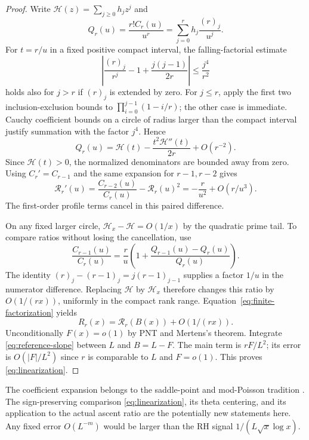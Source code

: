 \documentclass[11pt]{article}
\theoremstyle{definition}
\begin{document}
\begin{proof}
Write $\mathcal H(z)=\sum_{j\ge0}h_jz^j$ and
\[
 Q_r(u)=\frac{r!C_r(u)}{u^r}
       =\sum_{j=0}^r h_j\frac{(r)_j}{u^j}.
\]
For $t=r/u$ in a fixed positive compact interval, the falling-factorial
estimate
\[
 \left|\frac{(r)_j}{r^j}-1+\frac{j(j-1)}{2r}\right|
 \le \frac{j^4}{r^2}
\]
holds also for $j>r$ if $(r)_j$ is extended by zero. For $j\le r$,
apply the first two inclusion-exclusion bounds to
$\prod_{i=0}^{j-1}(1-i/r)$; the other case is immediate.
Cauchy coefficient bounds on a circle of radius larger than the
compact interval justify summation with the factor $j^4$. Hence
\begin{equation}\label{eq:profile-expansion}
 Q_r(u)=\mathcal H(t)-\frac{t^2\mathcal H''(t)}{2r}
                  +O(r^{-2}).
\end{equation}
Since $\mathcal H(t)>0$, the normalized denominators are bounded
away from zero. Using $C_r'=C_{r-1}$ and the same expansion for
$r-1,r-2$ gives
\begin{equation}\label{eq:reference-slope}
 \mathcal R_r'(u)
 =\frac{C_{r-2}(u)}{C_r(u)}-\mathcal R_r(u)^2
 =-\frac r{u^2}+O(r/u^3).
\end{equation}
The first-order profile terms cancel in this paired difference.

On any fixed larger circle,
$\mathcal H_x-\mathcal H=O(1/x)$ by the quadratic prime tail.
To compare ratios without losing the cancellation, use
\[
 \frac{C_{r-1}(u)}{C_r(u)}
 =\frac r u\left(1+\frac{Q_{r-1}(u)-Q_r(u)}{Q_r(u)}\right).
\]
The identity $(r)_j-(r-1)_j=j(r-1)_{j-1}$ supplies a factor $1/u$
in the numerator difference. Replacing $\mathcal H$ by $\mathcal H_x$
therefore changes this ratio by $O(1/(rx))$, uniformly in the compact
rank range. Equation~\eqref{eq:finite-factorization} yields
\[
 R_r(x)=\mathcal R_r(B(x))+O(1/(rx)).
\]
Unconditionally $F(x)=o(1)$ by PNT and Mertens's theorem.
Integrate \eqref{eq:reference-slope} between $L$ and $B=L-F$.
The main term is $rF/L^2$; its error is
$O(|F|/L^2)$ since $r$ is comparable to $L$ and $F=o(1)$.
This proves \eqref{eq:linearization}.
\end{proof}

The coefficient expansion belongs to the saddle-point and mod-Poisson
tradition \cite{ET,KN,FMN}. The sign-preserving comparison
\eqref{eq:linearization}, its theta centering, and its application to
the actual ascent ratio are the potentially new statements here.
Any fixed error $O(L^{-m})$ would be larger than the RH signal
$1/(L\sqrt{x}\log x)$.
\end{document}
